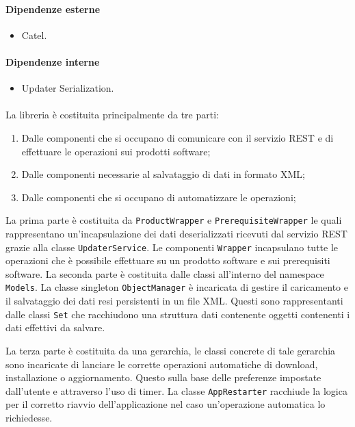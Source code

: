 \documentclass[../RelazioneFinale.tex]{subfiles}
\begin{document}
				\paragraph{Dipendenze esterne}
					\begin{itemize}
						\item Catel.
					\end{itemize}
				
				\paragraph{Dipendenze interne}
					\begin{itemize}
						\item Updater Serialization.
					\end{itemize}
				
				\paragraph{}
					La libreria è costituita principalmente da tre parti:
					\begin{enumerate}
						\item Dalle componenti che si occupano di comunicare con il servizio REST e di effettuare le operazioni sui prodotti software;
						\item Dalle componenti necessarie al salvataggio di dati in formato XML;
						\item Dalle componenti che si occupano di automatizzare le operazioni;
					\end{enumerate}
					
					La prima parte è costituita da \verb|ProductWrapper| e \verb|PrerequisiteWrapper| le quali rappresentano un'incapsulazione dei dati deserializzati ricevuti dal servizio REST grazie alla classe \verb|UpdaterService|.
					Le componenti \verb|Wrapper| incapsulano tutte le operazioni che è possibile effettuare su un prodotto software e sui prerequisiti software.
					La seconda parte è costituita dalle classi all'interno del namespace \verb|Models|. La classe singleton \verb|ObjectManager| è incaricata di gestire il caricamento e il salvataggio dei dati resi persistenti in un file XML. Questi sono rappresentanti dalle classi \verb|Set| che racchiudono una struttura dati contenente oggetti contenenti i dati effettivi da salvare.
					
					La terza parte è costituita da una gerarchia, le classi concrete di tale gerarchia sono incaricate di lanciare le corrette operazioni automatiche di download, installazione o aggiornamento. Questo sulla base delle preferenze impostate dall'utente e attraverso l'uso di timer. La classe \verb|AppRestarter| racchiude la logica per il corretto riavvio dell'applicazione nel caso un'operazione automatica lo richiedesse.
											
\end{document}
